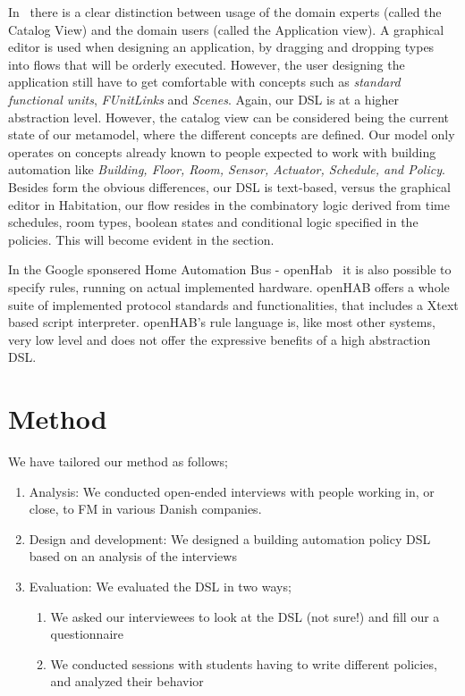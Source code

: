 \documentclass{llncs}
\begin{document}
In~\cite{habitation} there is a clear distinction between usage of the domain experts (called the Catalog View) and the domain users (called the Application view). A graphical editor is used when designing an application, by dragging and dropping types into flows that will be orderly executed. However, the user designing the application still have to get comfortable with concepts such as \textit{standard functional units}, \textit{FUnitLinks} and \textit{Scenes}. Again, our DSL is at a higher abstraction level. However, the catalog view can be considered being the current state of our metamodel, where the different concepts are defined. Our model only operates on concepts already known to people expected to work with building automation like \textit{Building, Floor, Room, Sensor, Actuator, Schedule, and Policy}. Besides form the obvious differences, our DSL is text-based, versus the graphical editor in Habitation, our flow resides in the combinatory logic derived from time schedules, room types, boolean states and conditional logic specified in the policies. This will become evident in the  section.

In the Google sponsered Home Automation Bus - openHab~\cite{openhab} it is also possible to specify rules, running on actual implemented hardware. openHAB offers a whole suite of implemented protocol standards and functionalities, that includes a Xtext based script interpreter. openHAB's rule language is, like most other systems, very low level and does not offer the expressive benefits of a high abstraction DSL.

\section{Method}\label{sec:method}
We have tailored our method as follows;

\begin{enumerate}
	\item Analysis: We conducted open-ended interviews with people working in, or close, to FM in various Danish companies.
	\item Design and development: We designed a building automation policy DSL based on an analysis of the interviews
	\item Evaluation: We evaluated the DSL in two ways;
	\begin{enumerate}
		\item We asked our interviewees to look at the DSL (not sure!) and fill our a questionnaire
		\item We conducted sessions with students having to write different policies, and analyzed their behavior
	\end{enumerate}
\end{enumerate}
\end{document}

